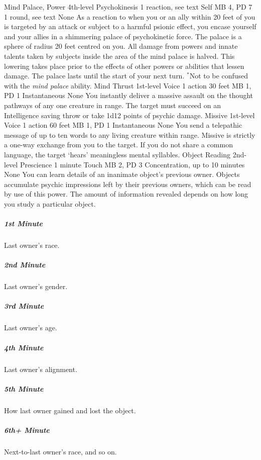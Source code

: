 \DndPowerHeader%
    {Mind Palace, Power\label{pwr:mind_palace_power}}
    {4th-level Psychokinesis}
    {1 reaction, see text}
    {Self}
    {MB 4, PD 7}
    {1 round, see text}
    {None}
As a reaction to when you or an ally within
20 feet of you is targeted by an attack or subject to a harmful
psionic effect, you encase yourself and your allies in a shimmering
palace of psychokinetic force. The palace is a sphere of radius
20 feet centred on you. All damage from powers and innate
talents taken by subjects inside the area of the mind palace
is halved. This lowering takes place prior to the effects
of other powers or abilities that lessen damage. The palace
lasts until the start of your next turn. $^*$Not to be confused
with the \emph{mind palace} ability.
\DndPowerHeader%
    {Mind Thrust\label{pwr:mind_thrust}}
    {1st-level Voice}
    {1 action}
    {30 feet}
    {MB 1, PD 1}
    {Instantaneous}
    {None}
You instantly deliver a massive assault on
the thought pathways of any one creature in range. The target
must succeed on an Intelligence saving throw or take 1d12
points of psychic damage.
\DndPowerHeader%
    {Missive\label{pwr:missive}}
    {1st-level Voice}
    {1 action}
    {60 feet}
    {MB 1, PD 1}
    {Instantaneous}
    {None}
You send a telepathic message of up to ten
words to any living creature within range. Missive is strictly
a one-way exchange from you to the target. If you do not share
a common language, the target `hears' meaningless mental
syllables.
\DndPowerHeader%
    {Object Reading\label{pwr:object_reading}}
    {2nd-level Prescience}
    {1 minute}
    {Touch}
    {MB 2, PD 3}
    {Concentration, up to 10 minutes}
    {None}
You can learn details of an inanimate object's
previous owner.
Objects accumulate psychic impressions
left by their previous owners,
which can be read by use of this power.
The amount of information revealed depends
on how long you study a particular object.

\subparagraph{1st Minute}
  Last owner's race.
\subparagraph{2nd Minute}
  Last owner's gender.
\subparagraph{3rd Minute}
  Last owner's age.
\subparagraph{4th Minute}
  Last owner's alignment.
\subparagraph{5th Minute}
  How last owner gained and lost the object.
\subparagraph{6th+ Minute}
  Next-to-last owner's race, and so on.

